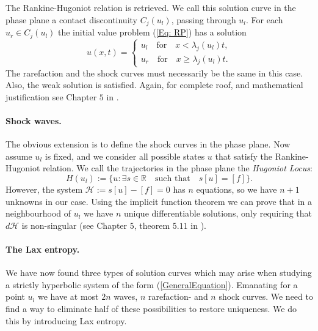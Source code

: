 \documentclass[10pt]{article}
\numberwithin{equation}{section}
\begin{document}
The Rankine-Hugoniot relation is retrieved. We call this solution curve in the phase plane a contact discontinuity $C_j(u_l)$, passing through $u_l$. For each $u_r \in C_j(u_l)$ the initial value problem (\ref{Eq: RP}) has a solution \begin{equation}
    u(x,t) = \begin{cases}
    u_l \quad \text{for} \quad x < \lambda_j(u_l)t, \\
    u_r \quad \text{for} \quad x \geq \lambda_j(u_l)t. 
    \end{cases}
    \label{Eq:ContactDiscSol}
\end{equation} 
The rarefaction and the shock curves must necessarily be the same in this case. Also, the weak solution is satisfied. Again, for complete roof, and mathematical justification see Chapter $5$ in \cite{HoldenH.Helge2015Ftfh}. 

\paragraph{Shock waves. }
The obvious extension is to define the shock curves in the phase plane. Now assume $u_l$ is fixed, and we consider all possible states $u$ that satisfy the Rankine-Hugoniot relation. We call the trajectories in the phase plane the \textit{Hugoniot Locus}:
\begin{equation}
    \label{Hugoniot_locus}
    H(u_l) := \{ u : \exists s\in \mathbb{R} \quad \text{such that} \quad s[u] = [f] \}.
\end{equation}
However, the system $ \mathcal{H} := s[u] - [f] = 0 $ has $n$ equations, so we have $n+1$ unknowns in our case. Using the implicit function theorem we can prove that in a neighbourhood of $u_l$ we have $n$ unique differentiable solutions, only requiring that $d \mathcal{H}$ is non-singular (see Chapter $5$, theorem $5.11$ in \cite{HoldenH.Helge2015Ftfh}). 
 
\paragraph{The Lax entropy.} We have now found three types of solution curves which may arise when studying a strictly hyperbolic system of the form (\ref{GeneralEquation}). Emanating for a point $u_l$ we have at most $2n$ waves, $n$ rarefaction- and $n$ shock curves. We need to find a way to eliminate half of these possibilities to restore uniqueness. We do this by introducing Lax entropy. 
\end{document}
